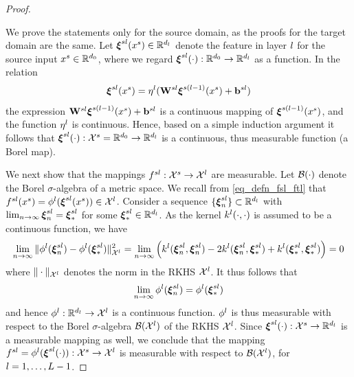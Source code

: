 \documentclass[review,supplement,onefignum,onetabnum]{siamonline250211}
\begin{document}
\begin{proof}

\label{pf_lem_fs_ft_measble}

We prove the statements only for the source domain, as the proofs for the target domain are the same. Let $\boldsymbol{\xi}^{sl} (x^s) \in \mathbb{R}^{d_l}$ denote the feature in layer $l$ for the source input $x^s\in \mathbb{R}^{{d_0}}$, where we regard $\boldsymbol{\xi}^{sl}(\cdot): \mathbb{R}^{{d_0}} \rightarrow \mathbb{R}^{d_l}$ as a function. In the relation 
%
\[
\boldsymbol{\xi}^{sl} (x^s) =\eta^l( \mathbf{W}^{sl} \boldsymbol{\xi}^{s(l-1)} (x^s)+ \mathbf{b}^{sl})
\]
%
the expression $ \mathbf{W}^{sl} \boldsymbol{\xi}^{s(l-1)} (x^s)+ \mathbf{b}^{sl}$ is a continuous mapping of $\boldsymbol{\xi}^{s(l-1)} (x^s)$, and the function $\eta^l $ is continuous. Hence, based on a simple induction argument it follows that $\boldsymbol{\xi}^{sl} (\cdot): \mathcal{X}^s= \mathbb{R}^{{d_0}} \rightarrow \mathbb{R}^{d_l}$ is a continuous, thus measurable function (a Borel map).

We next show that the mappings $f^{sl}: \mathcal{X}^s \rightarrow \mathcal{X}^l$ are measurable.   Let $\mathcal{B}(\cdot)$ denote the Borel $\sigma$-algebra of a metric space. We recall from \eqref{eq_defn_fsl_ftl} that $f^{sl}(x^s)=\phi^l(\boldsymbol{\xi}^{sl}(x^s)) \in \mathcal{X}^l $. Consider a sequence $\{\boldsymbol{\xi}^{sl}_n\} \subset \mathbb{R}^{d_l}$ with $\lim_{n \rightarrow \infty} \boldsymbol{\xi}^{sl}_n = \boldsymbol{\xi}^{sl}_*$ for some $\boldsymbol{\xi}^{sl}_* \in \mathbb{R}^{d_l}$. As the kernel $k^l(\cdot , \cdot ) $ is assumed to be a continuous function, we have
%
\begin{equation*}
\begin{split}
\lim_{n\rightarrow \infty} \| \phi^l(\boldsymbol{\xi}^{sl}_n) - \phi^l(\boldsymbol{\xi}^{sl}_*) \|^2_{\mathcal{X}^l} 
=\lim_{n\rightarrow \infty} 
\left(
    k^l(\boldsymbol{\xi}^{sl}_n, \boldsymbol{\xi}^{sl}_n) -2 k^l(\boldsymbol{\xi}^{sl}_n, \boldsymbol{\xi}^{sl}_* )  +k^l(\boldsymbol{\xi}^{sl}_*, \boldsymbol{\xi}^{sl}_*) \right)
    =0
\end{split}
\end{equation*}
%
where $\| \cdot \|_{\mathcal{X}^l}$ denotes the norm in the RKHS $\mathcal{X}^l$. It thus follows that
%
\[ \lim_{n \rightarrow \infty} \phi^l(\boldsymbol{\xi}^{sl}_n) = \phi^l ( \boldsymbol{\xi}^{sl}_*)\] 
%
and hence $\phi^l: \mathbb{R}^{d_l} \rightarrow \mathcal{X}^l$ is a continuous function. $\phi^l $ is thus measurable with respect to the Borel $\sigma$-algebra $ \mathcal{B}(\mathcal{X}^l)$   of the RKHS $\mathcal{X}^l$. Since $\boldsymbol{\xi}^{sl} (\cdot): \mathcal{X}^s \rightarrow \mathbb{R}^{d_l}$  is a measurable mapping as well, we conclude that the mapping $f^{sl}=\phi^l(\boldsymbol{\xi}^{sl}(\cdot)) : \mathcal{X}^s \rightarrow \mathcal{X}^l$ is measurable with respect to $\mathcal{B}(\mathcal{X}^l)$, for $l=1, \dots, L-1$.


\end{proof}
\end{document}

